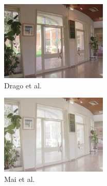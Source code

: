 \begin{figure}
\begin{subfigure}[b]{0.33\textwidth}
    \centering
    \includegraphics[width=\textwidth]{figures/chapter2/tmos44/44_drago03.png}
    \caption{Drago et al. ~\cite{drago2003adaptive}}
\end{subfigure}\hfill
\begin{subfigure}[b]{0.33\textwidth}
    \centering
    \includegraphics[width=\textwidth]{figures/chapter2/tmos44/44_mai11.png}
    \caption{Mai et al. ~\cite{mai2010optimizing}}
\end{subfigure}\hfill
\begin{subfigure}[b]{0.33\textwidth}
    \centering

\end{subfigure}
\end{figure}
